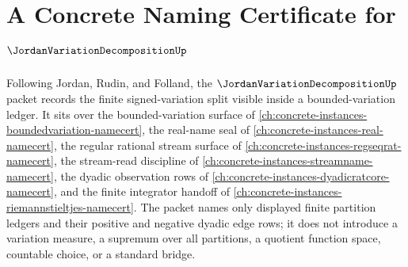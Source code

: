 \chapter{A Concrete Naming Certificate for $\JordanVariationDecompositionUp$}
\label{ch:concrete-instances-jordan-variation-decomposition-namecert}

Following Jordan, Rudin, and Folland, the $\JordanVariationDecompositionUp$ packet records the finite signed-variation split visible inside a bounded-variation ledger. It sits over the bounded-variation surface of \autoref{ch:concrete-instances-boundedvariation-namecert}, the real-name seal of \autoref{ch:concrete-instances-real-namecert}, the regular rational stream surface of \autoref{ch:concrete-instances-regseqrat-namecert}, the stream-read discipline of \autoref{ch:concrete-instances-streamname-namecert}, the dyadic observation rows of \autoref{ch:concrete-instances-dyadicratcore-namecert}, and the finite integrator handoff of \autoref{ch:concrete-instances-riemannstieltjes-namecert}. The packet names only displayed finite partition ledgers and their positive and negative dyadic edge rows; it does not introduce a variation measure, a supremum over all partitions, a quotient function space, countable choice, or a standard bridge.

